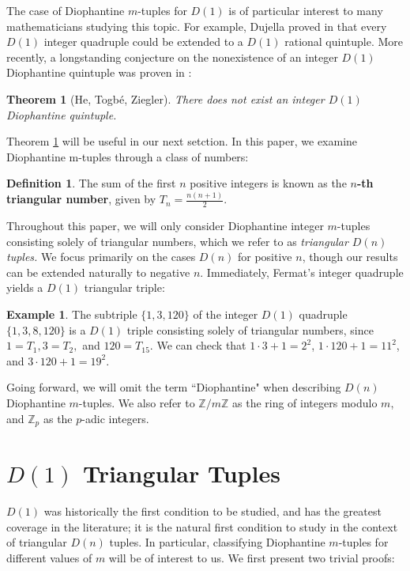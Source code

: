 \documentclass[12pt]{amsart}
\theoremstyle{theorem}
\newtheorem{theorem}{Theorem}
\theoremstyle{definition}
\newtheorem*{definition}{Definition}
\newtheorem{example}{Example}
\theoremstyle{plain}
\begin{document}
The case of Diophantine $m$-tuples for $D(1)$ is of particular interest to many mathematicians studying this topic. For example, Dujella proved in \cite{b5} that every $D(1)$ integer quadruple could be extended to a $D(1)$ rational quintuple. More recently, a longstanding conjecture on the nonexistence of an integer $D(1)$ Diophantine quintuple was proven in \cite{b6}:

\begin{theorem}[He, Togb\'{e}, Ziegler]\label{no quintuple}
    There does not exist an integer $D(1)$ Diophantine quintuple.
\end{theorem}

Theorem \ref{no quintuple} will be useful in our next setction. In this paper, we examine Diophantine m-tuples through a class of numbers:

\begin{definition}
    The sum of the first $n$ positive integers is known as the $n$\textbf{-th triangular number}, given by $T_n = \frac{n(n+1)}{2}$.
\end{definition} 

Throughout this paper, we will only consider Diophantine integer $m$-tuples consisting solely of triangular numbers, which we refer to as \emph{triangular $D(n)$ tuples.} We focus primarily on the cases $D(n)$ for positive $n$, though our results can be extended naturally to negative $n$. Immediately, Fermat's integer quadruple yields a $D(1)$ triangular triple:

\begin{example}\label{eg:tfermat}
    The subtriple $\{1, 3, 120 \}$ of the integer $D(1)$ quadruple $\{1, 3, 8, 120 \}$ is a $D(1)$ triple consisting solely of triangular numbers, since $1 = T_1, 3 = T_2,$ and $120 = T_{15}$. We can check that $1 \cdot 3 + 1 = 2^2$, $1 \cdot 120 + 1 = 11^2$, and $3 \cdot 120 + 1 = 19^2$.
\end{example}

Going forward, we will omit the term ``Diophantine" when describing $D(n)$ Diophantine $m$-tuples. We also refer to $\mathbb{Z} / m \mathbb{Z}$ as the ring of integers modulo $m$, and $\mathbb{Z}_p$ as the $p$-adic integers.

\section{$D(1)$ Triangular Tuples} \label{$D(1)$}

$D(1)$ was historically the first condition to be studied, and has the greatest coverage in the literature; it is the natural first condition to study in the context of triangular $D(n)$ tuples. In particular, classifying Diophantine $m$-tuples for different values of $m$ will be of interest to us. We first present two trivial proofs:
\end{document}
